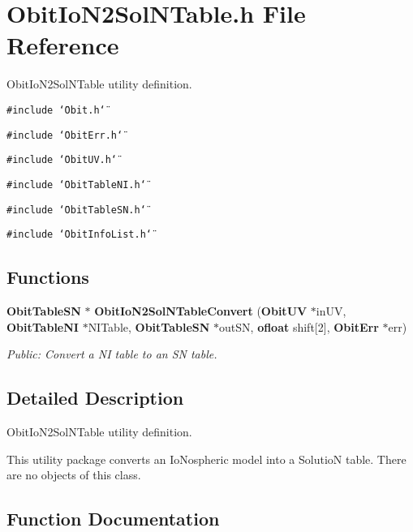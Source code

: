 \section{Obit\-Io\-N2Sol\-NTable.h File Reference}
\label{ObitIoN2SolNTable_8h}
Obit\-Io\-N2Sol\-NTable utility definition. 

{\tt \#include \char`\"{}Obit.h\char`\"{}}\par
{\tt \#include \char`\"{}Obit\-Err.h\char`\"{}}\par
{\tt \#include \char`\"{}Obit\-UV.h\char`\"{}}\par
{\tt \#include \char`\"{}Obit\-Table\-NI.h\char`\"{}}\par
{\tt \#include \char`\"{}Obit\-Table\-SN.h\char`\"{}}\par
{\tt \#include \char`\"{}Obit\-Info\-List.h\char`\"{}}\par
\subsection*{Functions}
\begin{CompactItemize}
\item 
{\bf Obit\-Table\-SN} $\ast$ {\bf Obit\-Io\-N2Sol\-NTable\-Convert} ({\bf Obit\-UV} $\ast$in\-UV, {\bf Obit\-Table\-NI} $\ast$NITable, {\bf Obit\-Table\-SN} $\ast$out\-SN, {\bf ofloat} shift[2], {\bf Obit\-Err} $\ast$err)
\begin{CompactList}\small\item\em Public: Convert a NI table to an SN table. \item\end{CompactList}\end{CompactItemize}


\subsection{Detailed Description}
Obit\-Io\-N2Sol\-NTable utility definition. 

This utility package converts an Io\-Nospheric model into a Solutio\-N table. There are no objects of this class.

\subsection{Function Documentation}
